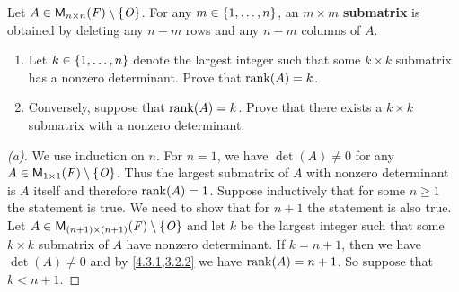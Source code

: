 \begin{ex}\label{ex:4.3.23}
	Let \(A \in \mathsf{M}_{{n} \times n}({\mathit{F}}) \setminus \left\lbrace\mathit{O}\right\rbrace\).
	For any \(m \in \left\lbrace1, \dots, n\right\rbrace\), an \(m \times m\) \textbf{submatrix} is obtained by deleting any \(n - m\) rows and any \(n - m\) columns of \(A\).
	\begin{enumerate}
		\item Let \(k \in \left\lbrace1, \dots, n\right\rbrace\) denote the largest integer such that some \(k \times k\) submatrix has a nonzero determinant.
		      Prove that \(\rk{A} = k\).
		\item Conversely, suppose that \(\rk{A} = k\).
		      Prove that there exists a \(k \times k\) submatrix with a nonzero determinant.
	\end{enumerate}
\end{ex}

\begin{proof}[(a)]
	We use induction on \(n\).
	For \(n = 1\), we have \(\det(A) \neq 0\) for any \(A \in \mathsf{M}_{{1} \times 1}({\mathit{F}}) \setminus \left\lbrace\mathit{O}\right\rbrace\).
	Thus the largest submatrix of \(A\) with nonzero determinant is \(A\) itself and therefore \(\rk{A} = 1\).
	Suppose inductively that for some \(n \geq 1\) the statement is true.
	We need to show that for \(n + 1\) the statement is also true.
	Let \(A \in \mathsf{M}_{{(n + 1)} \times (n + 1)}({\mathit{F}}) \setminus \left\lbrace\mathit{O}\right\rbrace\) and let \(k\) be the largest integer such that some \(k \times k\) submatrix of \(A\) have nonzero determinant.
	If \(k = n + 1\), then we have \(\det(A) \neq 0\) and by \cref{4.3.1,3.2.2} we have \(\rk{A} = n + 1\).
	So suppose that \(k < n + 1\).


\end{proof}
